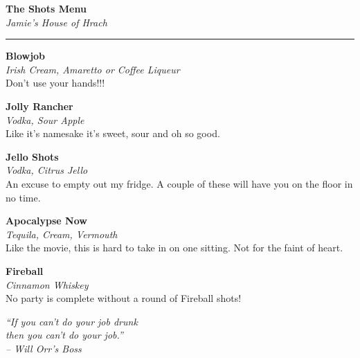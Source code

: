 \documentclass[12pt]{article}
\newcommand{\drink}[3]{
    \begin{center}
        \noindent\large \textbf{#1}
        \\\small \textit{#2}\\
        \normalsize #3 \\
        \vspace{8 mm}
    \end{center}
}
\begin{document}


\begin{center}
\LARGE \textbf{The Shots Menu} \\
      \small \textit{Jamie's House of Hrach} \\
      \noindent\rule{6in}{0.4pt}
      \end{center}

      \drink{Blowjob}{Irish Cream, Amaretto or Coffee Liqueur}{
         Don't use your hands!!!
      }

\drink{Jolly Rancher}{Vodka, Sour Apple}{
   Like it's namesake it's sweet, sour and oh so good.
}

\drink{Jello Shots}{Vodka, Citrus Jello}{
   An excuse to empty out my fridge. A couple of these will have you on
      the floor in no time.
}

\drink{Apocalypse Now}{Tequila, Cream, Vermouth}{
   Like the movie, this is hard to take in on one sitting. Not for the
      faint of heart.
}

\drink{Fireball}{Cinnamon Whiskey}{
   No party is complete without a round of Fireball shots!
}

\vfill
\begin{center}
    \noindent\textit{
       ``If you can’t do your job drunk \\
       then you can’t do your job.'' \\
       -- Will Orr's Boss
    }
\end{center}
\end{document}
